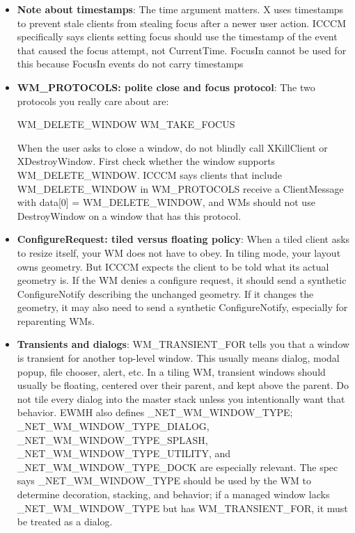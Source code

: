 \documentclass{report}
\begin{document}
\begin{itemize}
\begin{cppcode}
            \end{cppcode}
            \bigbreak \noindent 
            The WM reads WM\_PROTOCOLS. If WM\_TAKE\_FOCUS is present, the WM can send the client a message saying: “You may take focus now, using this timestamp.”
        \item \textbf{Note about timestamps}: The time argument matters. X uses timestamps to prevent stale clients from stealing focus after a newer user action. ICCCM specifically says clients setting focus should use the timestamp of the event that caused the focus attempt, not CurrentTime. FocusIn cannot be used for this because FocusIn events do not carry timestamps
        \item \textbf{WM\_PROTOCOLS: polite close and focus protocol}:  The two protocols you really care about are:
            \bigbreak \noindent 
            \begin{cppcode}
            WM_DELETE_WINDOW
            WM_TAKE_FOCUS
            \end{cppcode}
            \bigbreak \noindent 
            When the user asks to close a window, do not blindly call XKillClient or XDestroyWindow. First check whether the window supports WM\_DELETE\_WINDOW.
            \bigbreak \noindent 
            ICCCM says clients that include WM\_DELETE\_WINDOW in WM\_PROTOCOLS receive a ClientMessage with data[0] = WM\_DELETE\_WINDOW, and WMs should not use DestroyWindow on a window that has this protocol.
        \item \textbf{ConfigureRequest: tiled versus floating policy}: When a tiled client asks to resize itself, your WM does not have to obey. In tiling mode, your layout owns geometry.
            \bigbreak \noindent 
            But ICCCM expects the client to be told what its actual geometry is. If the WM denies a configure request, it should send a synthetic ConfigureNotify describing the unchanged geometry. If it changes the geometry, it may also need to send a synthetic ConfigureNotify, especially for reparenting WMs.
        \item \textbf{Transients and dialogs}: WM\_TRANSIENT\_FOR tells you that a window is transient for another top-level window. This usually means dialog, modal popup, file chooser, alert, etc.
            \bigbreak \noindent 
            In a tiling WM, transient windows should usually be floating, centered over their parent, and kept above the parent. Do not tile every dialog into the master stack unless you intentionally want that behavior.
            \bigbreak \noindent 
            EWMH also defines \_NET\_WM\_WINDOW\_TYPE; \_NET\_WM\_WINDOW\_TYPE\_DIALOG, \_NET\_WM\_WINDOW\_TYPE\_SPLASH, \_NET\_WM\_WINDOW\_TYPE\_UTILITY, and \_NET\_WM\_WINDOW\_TYPE\_DOCK are especially relevant. The spec says \_NET\_WM\_WINDOW\_TYPE should be used by the WM to determine decoration, stacking, and behavior; if a managed window lacks \_NET\_WM\_WINDOW\_TYPE but has WM\_TRANSIENT\_FOR, it must be treated as a dialog.

\end{itemize}
\end{document}
